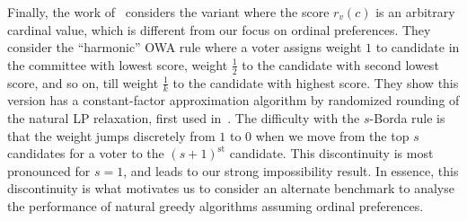 Finally, the work of~\cite{Byrka} considers the variant where the score $r_v(c)$ is an arbitrary cardinal value, which is different from our focus on ordinal preferences. They consider the ``harmonic'' OWA rule where a voter assigns weight $1$ to candidate in the committee with lowest score, weight $\frac{1}{2}$ to the candidate with second lowest score, and so on, till weight $\frac{1}{k}$ to the candidate with highest score. They show this version has a constant-factor approximation algorithm by randomized rounding of the natural LP relaxation, first used in~\cite{cornuejols1983}. The difficulty with the $s$-Borda rule is that the weight jumps discretely from $1$ to $0$ when we move from the top $s$ candidates for a voter to the $(s+1)^{\text{st}}$ candidate. This discontinuity is most pronounced for $s = 1$, and leads to our strong impossibility result. In essence, this discontinuity is what motivates us to consider an alternate benchmark to analyse the performance of natural greedy algorithms assuming ordinal preferences.
